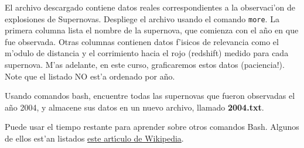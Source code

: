 \documentclass[11pt]{exam}
\begin{document}
\begin{questions}
\begin{parts}
\item El archivo descargado contiene datos reales correspondientes a la observaci'on de explosiones de Supernovas. Despliege el archivo usando el comando \texttt{more}. La primera columna lista el nombre de la supernova, que comienza con el a\~no en que fue observada. Otras columnas contienen datos f'isicos de relevancia como el m'odulo de distancia y el corrimiento hacia el rojo (redshift) medido para cada supernova. M'as adelante, en este curso, graficaremos estos datos (paciencia!). Note que el listado NO est'a ordenado por a\~no. 

\item Usando comandos bash, encuentre todas las supernovas que fueron observadas el a\~no 2004, y almacene sus datos en un nuevo archivo, llamado \textbf{2004.txt}.
\end{parts}


\item Puede usar el tiempo restante para aprender sobre otros comandos Bash. Algunos de ellos est'an listados \href{https://es.wikipedia.org/wiki/Comandos_Bash}{este art{\'\i}culo de Wikipedia}.


\end{questions}
\end{document}
